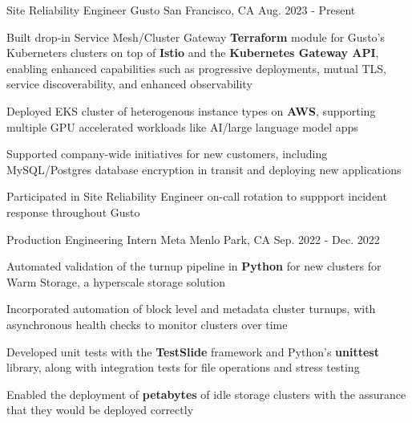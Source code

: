 

\begin{cventries}

\cventry
{Site Reliability Engineer} %
{Gusto} %
{San Francisco, CA} %
{Aug. 2023 - Present} %
{
  \begin{cvitems} %
    \item{Built drop-in Service Mesh/Cluster Gateway \textbf{Terraform} module for Gusto's Kuberneters clusters on top of \textbf{Istio} and the \textbf{Kubernetes Gateway API}, enabling enhanced capabilities such as progressive deployments, mutual TLS, service discoverability, and enhanced observability}
    \item{Deployed EKS cluster of heterogenous instance types on \textbf{AWS}, supporting multiple GPU accelerated workloads like AI/large language model apps}
    \item{Supported company-wide initiatives for new customers, including MySQL/Postgres database encryption in transit and deploying new applications}
    \item{Participated in Site Reliability Engineer on-call rotation to suppport incident response throughout Gusto}
  \end{cvitems}
}

\cventry
{Production Engineering Intern} %
{Meta} %
{Menlo Park, CA} %
{Sep. 2022 - Dec. 2022} %
{
  \begin{cvitems} %
    \item {Automated validation of the turnup pipeline in \textbf{Python} for new clusters for Warm Storage, a hyperscale storage solution}
    \item {Incorporated automation of block level and metadata cluster turnups, with asynchronous health checks to monitor clusters over time}
    \item {Developed unit tests with the \textbf{TestSlide} framework and Python's \textbf{unittest} library, along with integration tests for file operations and stress testing}
    \item {Enabled the deployment of \textbf{petabytes} of idle storage clusters with the assurance that they would be deployed correctly}
  \end{cvitems}
}


\end{cventries}
